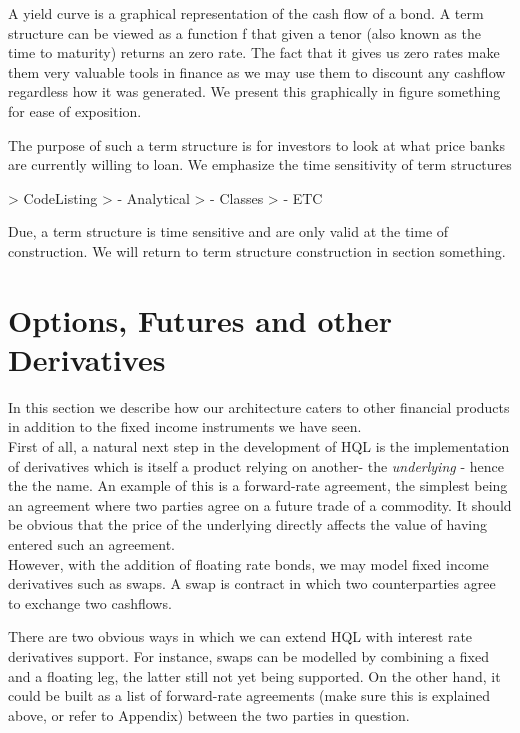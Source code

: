 A yield curve is a graphical representation of the cash flow of a bond.
A term structure can be viewed as a function f that given a tenor (also known 
as the time to maturity) returns an zero rate. The fact that it gives us zero 
rates make them very valuable tools in finance as we may use them to discount 
any cashflow regardless how it was generated.
We present this graphically in figure something for ease of exposition.

The purpose of such a term structure is for investors to look at what price 
banks are currently willing to loan. We emphasize the time sensitivity of term 
structures

> CodeListing
> 	- Analytical
>	- Classes
>	- ETC

Due, a term structure is time sensitive and are only valid at the time of 
construction. We will return to term structure construction in section 
something.

\section{Options, Futures and other Derivatives}

In this section we describe how our architecture caters to other financial 
products in addition to the fixed income instruments we have seen.\\

First of all, a natural next step in the development of HQL is the 
implementation of derivatives which is itself a product relying on another- the 
\emph{underlying} - hence the the name. An example of this is 
a forward-rate agreement, the simplest being an agreement where two parties 
agree on a future trade of a commodity. It should be obvious that the price of 
the underlying directly affects the value of having entered such an agreement.\\

However, with the addition of floating rate bonds, we may model fixed income 
derivatives such as swaps. A swap is contract in which two counterparties agree 
to exchange two cashflows.


There are two obvious ways in which we can extend HQL with interest rate 
derivatives support. For instance, swaps can be modelled by combining a fixed 
and a floating leg, the latter still not yet being supported. On the other 
hand, it could be built as a list of forward-rate agreements (make sure this is 
explained above, or refer to Appendix) between the two parties in question.
